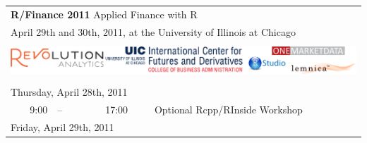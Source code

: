 \documentclass[letterpaper,10pt]{article}
\newcommand{\ra}[1]{\renewcommand{\arraystretch}{#1}}  %
\newcommand{\mylinecolor}[1]{\color{#1}\vspace{-8pt}}  %
\begin{document}
\thispagestyle{empty}


\ra{1.1} \sf

\begin{tabular}{rlrlp{5in}} %

  \multicolumn{5}{l}{\Huge \textbf{\color{KeynoteTalk} R/Finance 2011} \huge \phantom{i} Applied Finance with R} \\
  \multicolumn{5}{l}{\large \color{Breaks} April 29th and 30th, 2011, at the University of Illinois at Chicago} \\[3pt]

  \bottomrule \\

  \multicolumn{5}{l}{
    \centering
    \includegraphics[page=1,scale=1]{2011Sponsors.pdf}
  } \\[5pt]

  \bottomrule \\[3pt]

  \multicolumn{5}{l}{\large \color{Breaks} Thursday, April 28th, 2011} \\[10pt]
  \color{Breaks} 9:00 & \color{Breaks}-- & \color{Breaks} 17:00 &   & \small{\mylinecolor{Breaks} Optional Rcpp/RInside Workshop} \\[12pt]

  \multicolumn{5}{l}{\large Friday, April 29th, 2011} \\[10pt]


\end{tabular}
\end{document}
